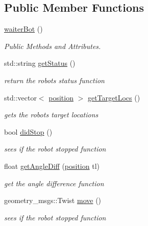 \subsection*{Public Member Functions}
\begin{DoxyCompactItemize}
\item 
\hyperlink{classwaiterBot_a9b3a45ca6b7700aa82ae8496aa85f2b3}{waiter\+Bot} ()
\begin{DoxyCompactList}\small\item\em Public Methods and Attributes. \end{DoxyCompactList}\item 
std\+::string \hyperlink{classwaiterBot_a877f608ceff919a2c18082de76bb39f7}{get\+Status} ()
\begin{DoxyCompactList}\small\item\em return the robot\textquotesingle{}s status function \end{DoxyCompactList}\item 
std\+::vector$<$ \hyperlink{classposition}{position} $>$ \hyperlink{classwaiterBot_a9ee50a152a69fcf37133892d149ec352}{get\+Target\+Locs} ()
\begin{DoxyCompactList}\small\item\em gets the robot\textquotesingle{}s target locations \end{DoxyCompactList}\item 
bool \hyperlink{classwaiterBot_a20494335cbe4d278c04c7e7d0440b037}{did\+Stop} ()
\begin{DoxyCompactList}\small\item\em sees if the robot stopped function \end{DoxyCompactList}\item 
float \hyperlink{classwaiterBot_a7269cbb34bbca97f1002206079fdbfe1}{get\+Angle\+Diff} (\hyperlink{classposition}{position} tl)
\begin{DoxyCompactList}\small\item\em get the angle difference function \end{DoxyCompactList}\item 
geometry\+\_\+msgs\+::\+Twist \hyperlink{classwaiterBot_a1c6e589b55155bae665dde42d664a292}{move} ()
\begin{DoxyCompactList}\small\item\em sees if the robot stopped function \end{DoxyCompactList}\end{DoxyCompactItemize}
